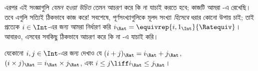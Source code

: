 \documentclass[../../../include/open-logic-section]{subfiles}
\begin{document}
এরপর এই সংজ্ঞাগুলি \emph{যেমন হওয়া উচিত} তেমন আচরণ করে কি না যাচাই করতে হবে; কাজটি আমরা -এ রেখেছি। তবে এগুলি সত্যিই ঠিকভাবে কাজ করে!{} সবশেষে, পূর্ণসংখ্যাগুলিকে মূলদ সংখ্যা \emph{হিসেবে} ধরার কোনো উপায় চাই; তাই প্রত্যেক $i \in \Int$-এর জন্য আমরা নির্ধারণ করি $i_\Rat =
\equivrep{i, 1_\Int}{\Ratequiv}$। আবারও, এসবের সবকিছু ঠিকভাবে আচরণ করে কি না -এ যাচাই করি।

\begin{prob}
যেকোনো $i, j \in \Int$-এর জন্য দেখাও যে $(i + j)_\Rat = i_\Rat+ j_\Rat$, $(i \times j)_\Rat =
i_\Rat \times j_\Rat$, এবং $i \leq j \liff i_\Rat \leq j_\Rat$।
\end{prob}
\end{document}
